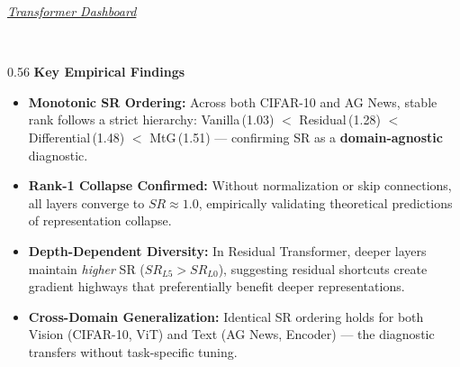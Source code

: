 \documentclass[aspectratio=169,10pt]{beamer}
\begin{document}
\begin{frame}[plain]
\vspace{2pt}

%
\hfill{\tiny\itshape\color{MutedGrey} \href{http://35.223.97.175:3000/}{Transformer Dashboard}}\hspace{6pt}\\[-3pt]
\hspace{6pt}{\color{RedWarn}\rule{1.1cm}{1.6pt}}\\[2pt]

\begin{columns}[t]
\begin{column}{0.56\textwidth}
    {\footnotesize\textbf{Key Empirical Findings}}
    \vspace{-3pt}
    \begin{itemize}\setlength\itemsep{-1pt}\setlength\parskip{0pt}
        \item[\tiny$\bullet$] {\tiny\textbf{Monotonic SR Ordering:} Across both CIFAR-10 and AG News, stable rank follows a strict hierarchy: Vanilla\,(1.03) $<$ Residual\,(1.28) $<$ Differential\,(1.48) $<$ MtG\,(1.51) --- confirming SR as a \textbf{domain-agnostic} diagnostic.}
        \item[\tiny$\bullet$] {\tiny\textbf{Rank-1 Collapse Confirmed:} Without normalization or skip connections, all layers converge to $SR \approx 1.0$, empirically validating theoretical predictions of representation collapse.}
        \item[\tiny$\bullet$] {\tiny\textbf{Depth-Dependent Diversity:} In Residual Transformer, deeper layers maintain \textit{higher} SR ($SR_{L5} > SR_{L0}$), suggesting residual shortcuts create gradient highways that preferentially benefit deeper representations.}
        \item[\tiny$\bullet$] {\tiny\textbf{Cross-Domain Generalization:} Identical SR ordering holds for both Vision (CIFAR-10, ViT) and Text (AG News, Encoder) --- the diagnostic transfers without task-specific tuning.}
    \end{itemize}


\end{column}
\end{columns}
\end{frame}
\end{document}
